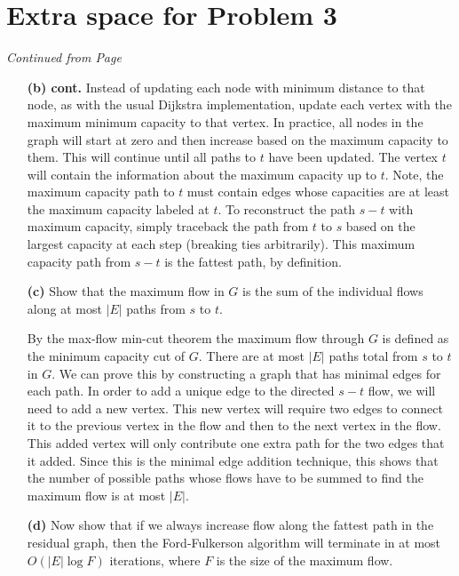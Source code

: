 \documentclass[11pt]{article}
\begin{document}
\section*{Extra space for Problem 3}
\emph{Continued from Page \pageref{pg:end-of-p3}}
 
 \label{pg:p3-continuation}
\begin{itemize}
 \item[{\bf (b) cont.}]
 Instead of updating each node with minimum distance to that node, as with the
 usual Dijkstra implementation, update each vertex with the maximum minimum capacity to that 
 vertex. In practice, all nodes in the graph will start at zero and then increase
 based on the maximum capacity to them. This will continue until all paths to $t$
 have been updated. The vertex $t$ will contain the information about the 
 maximum capacity up to $t$. Note, the maximum capacity path to $t$ must contain
 edges whose capacities are at least the maximum capacity labeled at $t$. 
 To reconstruct the path $s - t$ with maximum 
 capacity, simply traceback the path from $t$ to $s$ based on the largest 
 capacity at each step (breaking ties arbitrarily). This maximum capacity
 path from $s - t$ is the fattest path, by definition. 


\item[{\bf (c)}] Show that the maximum flow in $G$ is the sum of the individual
  flows along at most $|E|$ paths from $s$ to $t$.
  
  By the max-flow min-cut theorem the maximum flow through $G$ is defined as
  the minimum capacity cut of $G$. There are at most $|E|$ paths total from 
  $s$ to $t$ in $G$. We can prove this by constructing a graph that has minimal
  edges for each path. In order to add a unique edge to the directed $s - t$
  flow, we will need to add a new vertex. This new vertex will require two edges
  to connect it to the previous vertex in the flow and then to the next vertex in the
  flow. This added vertex will only contribute one extra path for the 
  two edges that it added. Since this is the minimal edge addition technique,
  this shows that the number of possible paths whose
  flows have to be summed to find the maximum flow is at most $|E|$.

\item[{\bf (d)}] Now show that if we always increase flow along the 
  fattest path in the residual graph, then the Ford-Fulkerson algorithm will 
  terminate in at most $O(|E|\log F)$ iterations, where $F$ is the size of the 
  maximum flow.
  

\end{itemize}
\end{document}
